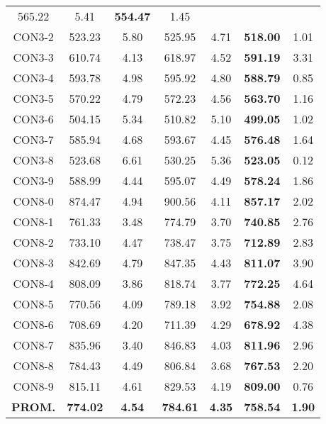 \begin{table}[ht]
\begin{tabular}{c c c c c c c}
565.22 & 5.41 & \bf{554.47} & 
1.45\\CON3-2 & 523.23 & 5.80 & 
525.95 & 4.71 & \bf{518.00} & 
1.01\\CON3-3 & 610.74 & 4.13 & 
618.97 & 4.52 & \bf{591.19} & 
3.31\\CON3-4 & 593.78 & 4.98 & 
595.92 & 4.80 & \bf{588.79} & 
0.85\\CON3-5 & 570.22 & 4.79 & 
572.23 & 4.56 & \bf{563.70} & 
1.16\\CON3-6 & 504.15 & 5.34 & 
510.82 & 5.10 & \bf{499.05} & 
1.02\\CON3-7 & 585.94 & 4.68 & 
593.67 & 4.45 & \bf{576.48} & 
1.64\\CON3-8 & 523.68 & 6.61 & 
530.25 & 5.36 & \bf{523.05} & 
0.12\\CON3-9 & 588.99 & 4.44 & 
595.07 & 4.49 & \bf{578.24} & 
1.86\\CON8-0 & 874.47 & 4.94 & 
900.56 & 4.11 & \bf{857.17} & 
2.02\\CON8-1 & 761.33 & 3.48 & 
774.79 & 3.70 & \bf{740.85} & 
2.76\\CON8-2 & 733.10 & 4.47 & 
738.47 & 3.75 & \bf{712.89} & 
2.83\\CON8-3 & 842.69 & 4.79 & 
847.35 & 4.43 & \bf{811.07} & 
3.90\\CON8-4 & 808.09 & 3.86 & 
818.74 & 3.77 & \bf{772.25} & 
4.64\\CON8-5 & 770.56 & 4.09 & 
789.18 & 3.92 & \bf{754.88} & 
2.08\\CON8-6 & 708.69 & 4.20 & 
711.39 & 4.29 & \bf{678.92} & 
4.38\\CON8-7 & 835.96 & 3.40 & 
846.83 & 4.03 & \bf{811.96} & 
2.96\\CON8-8 & 784.43 & 4.49 & 
806.84 & 3.68 & \bf{767.53} & 
2.20\\CON8-9 & 815.11 & 4.61 & 
829.53 & 4.19 & \bf{809.00} & 
0.76\\\bf{PROM.} & 
\bf{774.02} & \bf{4.54} & \bf{784.61} & \bf{4.35} & \bf{758.54} & \bf{1.90}\\[1ex]\hline
\end{tabular}
\label{table:nonlin}
\end{table} \clearpage
